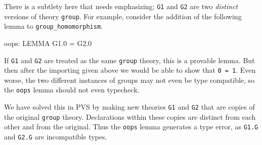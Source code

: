 \documentclass[11pt,twoside,openright,titlepage]{cslreport}
\begin{document}
There is a subtlety here that needs emphasizing; \texttt{G1} and
\texttt{G2} are two \emph{distinct} versions of theory \texttt{group}.
For example, consider the addition of the following lemma to
\texttt{group\_homomorphism}.
\begin{session}
oops: LEMMA G1.0 = G2.0
\end{session}
\noindent If \texttt{G1} and \texttt{G2} are treated as the same
\texttt{group} theory, this is a provable lemma.  But then after the
importing given above we would be able to show that \texttt{0 = 1}.  Even
worse, the two different instances of groups may not even be type
compatible, so the \texttt{oops} lemma should not even typecheck.

We have solved this in PVS by making new theories \texttt{G1} and
\texttt{G2} that are copies of the original \texttt{group} theory.
Declarations within these copies are distinct from each other and from the
original.  Thus the \texttt{oops} lemma generates a type error, as
\texttt{G1.G} and \texttt{G2.G} are incompatible types.
\end{document}
